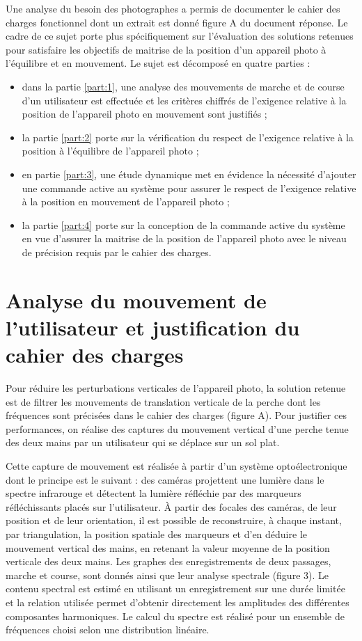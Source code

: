 Une analyse du besoin des photographes a permis de documenter le cahier des charges fonctionnel dont un extrait est donné figure A du document réponse. Le cadre de ce sujet porte plus spécifiquement sur l'évaluation des solutions retenues pour satisfaire les objectifs de maitrise de la position d'un appareil photo à l'équilibre et en mouvement. Le sujet est décomposé en quatre parties :

\begin{itemize}
  \item dans la partie \ref{part:1}, une analyse des mouvements de marche et de course d'un utilisateur est effectuée et les critères chiffrés de l'exigence relative à la position de l'appareil photo en mouvement sont justifiés ;
  \item la partie \ref{part:2} porte sur la vérification du respect de l'exigence relative à la position à l'équilibre de l'appareil photo ;
  \item en partie \ref{part:3}, une étude dynamique met en évidence la nécessité d'ajouter une commande active au système pour assurer le respect de l'exigence relative à la position en mouvement de l'appareil photo ;
  \item la partie \ref{part:4} porte sur la conception de la commande active du système en vue d'assurer la maitrise de la position de l'appareil photo avec le niveau de précision requis par le cahier des charges.

\end{itemize}

\section{\label{part:1}Analyse du mouvement de l'utilisateur et justification du cahier des charges }
Pour réduire les perturbations verticales de l'appareil photo, la solution retenue est de filtrer les mouvements de translation verticale de la perche dont les fréquences sont précisées dans le cahier des charges (figure A). Pour justifier ces performances, on réalise des captures du mouvement vertical d'une perche tenue des deux mains par un utilisateur qui se déplace sur un sol plat.

Cette capture de mouvement est réalisée à partir d'un système optoélectronique dont le principe est le suivant : des caméras projettent une lumière dans le spectre infrarouge et détectent la lumière réfléchie par des marqueurs réfléchissants placés sur l'utilisateur. À partir des focales des caméras, de leur position et de leur orientation, il est possible de reconstruire, à chaque instant, par triangulation, la position spatiale des marqueurs et d'en déduire le mouvement vertical des mains, en retenant la valeur moyenne de la position verticale des deux mains. Les graphes des enregistrements de deux passages, marche et course, sont donnés ainsi que leur analyse spectrale (figure 3). Le contenu spectral est estimé en utilisant un enregistrement sur une durée limitée et la relation utilisée permet d'obtenir directement les amplitudes des différentes composantes harmoniques. Le calcul du spectre est réalisé pour un ensemble de fréquences choisi selon une distribution linéaire.


